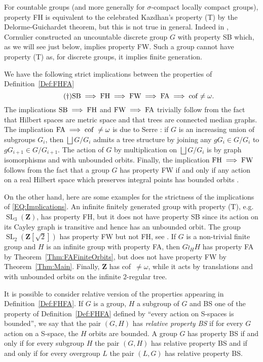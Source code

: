 \documentclass[a4paper]{article}
\newcommand{\PH}[1]{\todo[color={blue!33},size=small]{#1}}
\theoremstyle{definition}
\DeclareMathOperator\SL{SL}
\newcommand*{\field}[1]{\mathbf{#1}}
\newcommand*{\Z}{\field{Z}}
\begin{document}
For countable groups (and more generally for $\sigma$-compact locally compact groups), property FH is equivalent to the celebrated Kazdhan's property (T) by the Delorme-Guichardet theorem, but this is not true in general. Indeed in \cite{MR2240370}, Cornulier constructed an uncountable discrete group $G$ with property SB which, as we will see just below, implies property FW. Such a group cannot have property (T) as, for discrete groups, it implies finite generation.

We have the following strict implications between the properties of Definition~\ref{Def:FHFA} %
\begin{equation}\tag{\dag}\label{EQ:Implications}
	\textnormal{SB}\implies \textnormal{FH}\implies \textnormal{FW}\implies \textnormal{FA}\implies\textnormal{cof~$\neq\omega$}.
\end{equation}
The implications $\textnormal{SB}\implies \textnormal{FH}$ and $\textnormal{FW}\implies \textnormal{FA}$ trivially follow from the fact that Hilbert spaces are metric space and that trees are connected median graphs.
The implication $\textnormal{FA}\implies\textnormal{cof~}\neq\omega$ is due to Serre \cite{MR0476875}: if $G$ is an increasing union of subgroups $G_i$, then $\bigsqcup G/G_i$ admits a tree structure by joining any $gG_i\in G/G_i$ to $gG_{i+1}\in G/G_{i+1}$. The action of $G$ by multiplication on $\bigsqcup G/G_i$ is by graph isomorphisms and with unbounded orbits.
Finally, the implication $\textnormal{FH}\implies \textnormal{FW}$ follows from the fact that a group $G$ has property FW if and only if any action on a real Hilbert space which preserves integral points has bounded orbits \cite{Cornulier2013}.

On the other hand, here are some examples for the strictness of the implications of \eqref{EQ:Implications}.
An infinite finitely generated group with property (T), e.g. $\SL_3(\Z)$, has property FH, but it does not have property SB since its action on its Cayley graph is transitive and hence has an unbounded orbit.
The group $\SL_2(\Z[\sqrt{2}])$ has property FW but not FH, see \cite{MR3299841}.
If $G$ is a non-trivial finite group and $H$ is an infinite group with property FA, then $G\wr_HH$ has property FA by Theorem~\ref{Thm:FAFiniteOrbits}, but does not have property FW by Theorem~\ref{Thm:Main}.
Finally, $\Z$ has cof~$\neq\omega$, while it acts by translations and with unbounded orbits on the infinite $2$-regular tree.

It is possible to consider relative version of the properties appearing in Definition~\ref{Def:FHFA}.%
If $G$ is a group, $H$ a subgroup of $G$ and BS one of the property of Definition~\ref{Def:FHFA} defined by ``every action on S-spaces is bounded'', we say that the pair $(G,H)$ has \emph{relative property BS} if for every $G$ action on a S-space, the $H$ orbits are bounded.
A group $G$ has property BS if and only if for every subgroup $H$ the pair $(G,H)$ has relative property BS and if and only if for every overgroup $L$ the pair $(L,G)$ has relative property BS.
%
%
%
%
\end{document}
